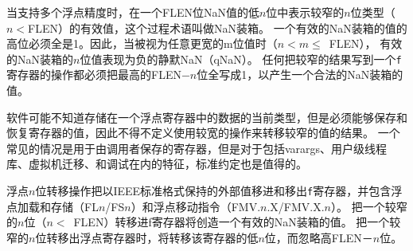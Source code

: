 当支持多个浮点精度时，在一个FLEN位NaN值的低$n$位中表示较窄的$n$位类型（$n<$FLEN）的有效值，这个过程术语叫做NaN装箱。
一个有效的NaN装箱的值的高位必须全是1。因此，当被视为任意更宽的m位值时（\mbox{$n < m \leq$ FLEN}），
有效的NaN装箱的$n$位值表现为负的静默NaN（qNaN）。
任何把较窄的结果写到一个{\tt f}寄存器的操作都必须把最高的FLEN$-n$位全写成1，以产生一个合法的NaN装箱的值。

\begin{commentary}
  软件可能不知道存储在一个浮点寄存器中的数据的当前类型，但是必须能够保存和恢复寄存器的值，因此不得不定义使用较宽的操作来转移较窄的值的结果。
  一个常见的情况是用于由调用者保存的寄存器，但是对于包括varargs、用户级线程库、虚拟机迁移、和调试在内的特征，标准约定也是值得的。
\end{commentary}

浮点$n$位转移操作把以IEEE标准格式保持的外部值移进和移出{\tt f}寄存器，并包含浮点加载和存储（FL$n$/FS$n$）和浮点移动指令（FMV.$n$.X/FMV.X.$n$）。
把一个较窄的$n$位（\mbox{$n<$ FLEN}）转移进f寄存器将创造一个有效的NaN装箱的值。
把一个较窄的$n$位转移出浮点寄存器时，将转移该寄存器的低$n$位，而忽略高FLEN－$n$位。

